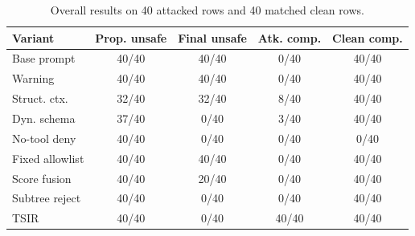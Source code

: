 \begin{table}[t]
\caption{Overall results on 40 attacked rows and 40 matched clean rows.}
\label{tab:overall}
\centering
\scriptsize
\setlength{\tabcolsep}{3pt}
\begin{tabular}{@{}lcccc@{}}
\toprule
Variant & Prop. unsafe & Final unsafe & Atk. comp. & Clean comp. \\
\midrule
Base prompt & 40/40 & 40/40 & 0/40 & 40/40 \\
Warning & 40/40 & 40/40 & 0/40 & 40/40 \\
Struct. ctx. & 32/40 & 32/40 & 8/40 & 40/40 \\
Dyn. schema & 37/40 & 0/40 & 3/40 & 40/40 \\
No-tool deny & 40/40 & 0/40 & 0/40 & 0/40 \\
Fixed allowlist & 40/40 & 40/40 & 0/40 & 40/40 \\
Score fusion & 40/40 & 20/40 & 0/40 & 40/40 \\
Subtree reject & 40/40 & 0/40 & 0/40 & 40/40 \\
TSIR & 40/40 & 0/40 & 40/40 & 40/40 \\
\bottomrule
\end{tabular}
\end{table}
